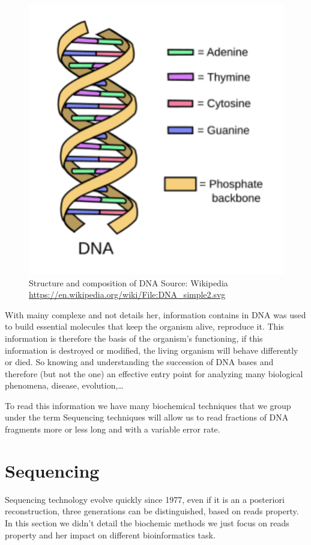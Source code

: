 \documentclass[./main.tex]{subfiles}
\begin{document}
\begin{figure}[ht]
    \centering
    \includegraphics[]{introduction/images/DNA.pdf}
    \caption{Structure and composition of DNA Source: Wikipedia \protect\url{https://en.wikipedia.org/wiki/File:DNA_simple2.svg}}
    \label{intro:fig:dna_rna_pres}
\end{figure}

With mainy complexe and not details her, information contains in DNA was used to build essential molecules that keep the organism alive, reproduce it. This information is therefore the basis of the organism's functioning, if this information is destroyed or modified, the living organism will behave differently or died. So knowing and understanding the succession of DNA bases and therefore (but not the one) an effective entry point for analyzing many biological phenomena, disease, evolution,…

To read this information we have many biochemical techniques that we group under the term Sequencing techniques will allow us to read fractions of DNA fragments more or less long and with a variable error rate.

\section{Sequencing}

Sequencing technology evolve quickly since 1977\cite{sanger_sequencing}, even if it is an a posteriori reconstruction, three generations can be distinguished, based on reads property. In this section we didn't detail the biochemic methods we just focus on reads property and her impact on different bioinformatics task.
\end{document}
